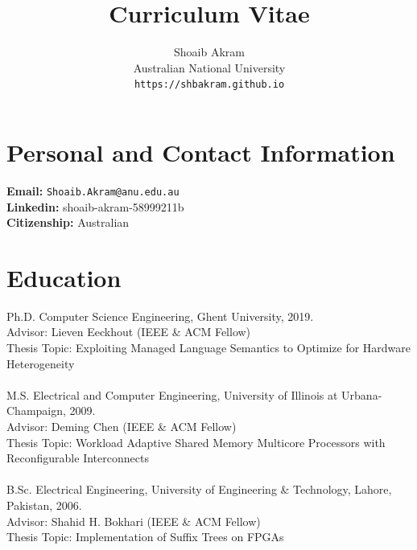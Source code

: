 \documentclass[singlecolumn,singlespace,11pt,a4paper]{article}
\begin{document}
\title{ { \bfseries Curriculum Vitae} }
\author{Shoaib Akram\\
	Australian National University \\
        \texttt{https://shbakram.github.io}
       }
\date{}
\maketitle

\section*{Personal and Contact Information}

\noindent \textbf{Email:} \texttt{Shoaib.Akram@anu.edu.au} \\ 
\noindent \textbf{Linkedin:} shoaib-akram-58999211b \\
\noindent \textbf{Citizenship:} Australian

\section*{Education}
\noindent Ph.D. Computer Science Engineering, Ghent University, 2019. \\
Advisor: Lieven Eeckhout (IEEE \& ACM Fellow)  \\
Thesis Topic: Exploiting Managed Language Semantics to Optimize for Hardware Heterogeneity
\\
\\
\noindent M.S. Electrical and Computer Engineering, University of Illinois at Urbana-Champaign, 2009. \\
Advisor: Deming Chen (IEEE \& ACM Fellow) \\
Thesis Topic: Workload Adaptive Shared Memory Multicore Processors with Reconfigurable Interconnects
\\
\\
\noindent B.Sc. Electrical Engineering, University of Engineering \& Technology, Lahore, Pakistan, 2006.\\
Advisor: Shahid H. Bokhari (IEEE \& ACM Fellow) \\
Thesis Topic: Implementation of Suffix Trees on FPGAs 
\end{document}
